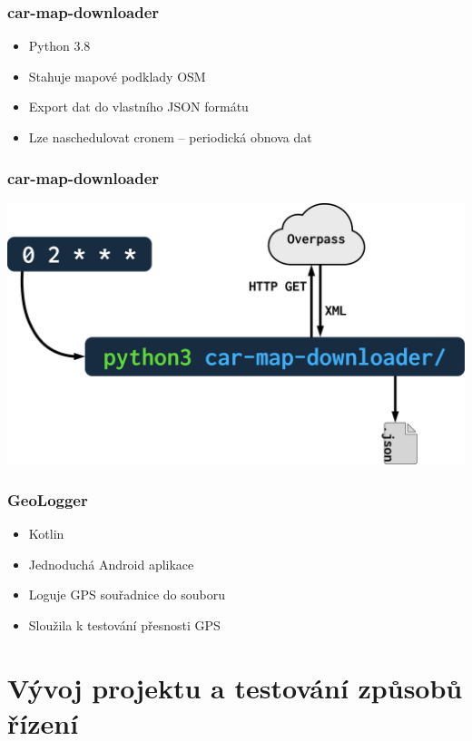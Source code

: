 \documentclass{beamer}
\begin{document}
\begin{frame}
    \frametitle{car-map-downloader}
    \begin{itemize}
        \item Python 3.8
        \item Stahuje mapové podklady OSM
        \item Export dat do vlastního JSON formátu
        \item Lze naschedulovat cronem -- periodická obnova dat
    \end{itemize}
\end{frame}

\begin{frame}
    \frametitle{car-map-downloader}
    \begin{center}
        \includegraphics[width=0.9\columnwidth]{car-map-downloader}
    \end{center}
\end{frame}

\begin{frame}
    \frametitle{GeoLogger}
    \begin{itemize}
        \item Kotlin
        \item Jednoduchá Android aplikace
        \item Loguje GPS souřadnice do souboru
        \item Sloužila k testování přesnosti GPS
    \end{itemize}
\end{frame}

\section{Vývoj projektu a testování způsobů řízení}
\end{document}
